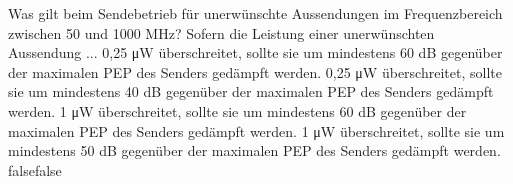     {Was gilt beim Sendebetrieb für unerwünschte Aussendungen im Frequenzbereich zwischen 50 und 1000 MHz? Sofern die Leistung einer unerwünschten Aussendung ...}
    {0,25 μW überschreitet, sollte sie um mindestens 60 dB gegenüber der maximalen PEP des Senders gedämpft werden.}
    {0,25 μW überschreitet, sollte sie um mindestens 40 dB gegenüber der maximalen PEP des Senders gedämpft werden.}
    {1 μW überschreitet, sollte sie um mindestens 60 dB gegenüber der maximalen PEP des Senders gedämpft werden.}
    {1 μW überschreitet, sollte sie um mindestens 50 dB gegenüber der maximalen PEP des Senders gedämpft werden.}
    {false}{false}
